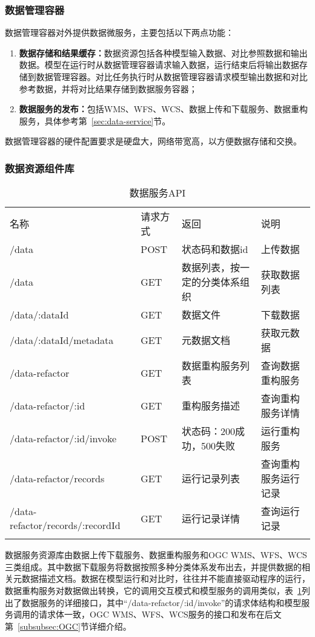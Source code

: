 \subsubsection{数据管理容器}
数据管理容器对外提供数据微服务，主要包括以下两点功能：
\begin{enumerate}[(1)]
\item \textbf{数据存储和结果缓存：}数据资源包括各种模型输入数据、对比参照数据和输出数据。模型在运行时从数据管理容器请求输入数据，运行结束后将输出数据存储到数据管理容器。对比任务执行时从数据管理容器请求模型输出数据和对比参考数据，并将对比结果存储到数据服务容器；
\item \textbf{数据服务的发布：}包括WMS、WFS、WCS、数据上传和下载服务、数据重构服务，具体参考第~\ref{sec:data-service}节。
\end{enumerate}

数据管理容器的硬件配置要求是硬盘大，网络带宽高，以方便数据存储和交换。

\subsubsection{数据资源组件库}
\noindent\begin{table}[!htbp]
    \centering
    \caption{数据服务API}
    \label{tab:data-service-API}
    \begin{tabular}{llll}
        \Xhline{1.5pt}
        名称 & 请求方式 & 返回 & 说明 \\
        \Xhline{1.5pt}
        /data & POST & 状态码和数据id & 上传数据 \\
        /data & GET & \multicolumn{1}{m{0.24\columnwidth}}{数据列表，按一定的分类体系组织} & 获取数据列表 \\
        /data/:dataId & GET & 数据文件 & 下载数据 \\
        /data/:dataId/metadata & GET & 元数据文档 & 获取元数据 \\
        /data-refactor & GET & 数据重构服务列表 & \multicolumn{1}{m{0.18\columnwidth}}{查询数据重构服务} \\
        /data-refactor/:id & GET & 重构服务描述 & \multicolumn{1}{m{0.18\columnwidth}}{查询重构服务详情} \\
        /data-refactor/:id/invoke & POST & \multicolumn{1}{m{0.24\columnwidth}}{状态码：200成功，500失败} & 运行重构服务 \\
        /data-refactor/records & GET & 运行记录列表 & \multicolumn{1}{m{0.18\columnwidth}}{查询重构服务运行记录} \\
        /data-refactor/records/:recordId & GET & 运行记录详情 & 查询运行记录 \\
        \Xhline{1.5pt}
    \end{tabular}
\end{table}
数据服务资源库由数据上传下载服务、数据重构服务和OGC WMS、WFS、WCS三类组成。其中数据下载服务将数据按照多种分类体系发布出去，并提供数据的相关元数据描述文档。数据在模型运行和对比时，往往并不能直接驱动程序的运行，数据重构服务对数据做出转换，它的调用交互模式和模型服务的调用类似，表~\ref{tab:data-service-API}列出了数据服务的详细接口，其中“/data-refactor/:id/invoke”的请求体结构和模型服务调用的请求体一致，OGC WMS、WFS、WCS服务的接口和发布在后文第~\ref{subsubsec:OGC}节详细介绍。

